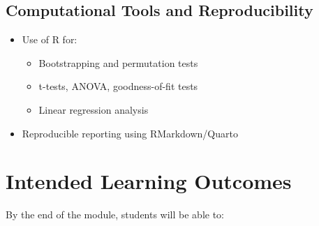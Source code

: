 \documentclass[
  a4paper,
  DIV=11,
  numbers=noendperiod,
  oneside]{scrreprt}
\providecommand{\tightlist}{%
  \setlength{\itemsep}{0pt}\setlength{\parskip}{0pt}}
\theoremstyle{plain}
\theoremstyle{definition}
\theoremstyle{definition}
\theoremstyle{definition}
\theoremstyle{plain}
\theoremstyle{remark}
\begin{document}
\subsection*{Computational Tools and
Reproducibility}\label{computational-tools-and-reproducibility}

\begin{itemize}
\tightlist
\item
  Use of R for:

  \begin{itemize}
  \tightlist
  \item
    Bootstrapping and permutation tests\\
  \item
    t-tests, ANOVA, goodness-of-fit tests\\
  \item
    Linear regression analysis\\
  \end{itemize}
\item
  Reproducible reporting using RMarkdown/Quarto
\end{itemize}

\section*{Intended Learning Outcomes}\label{intended-learning-outcomes}


By the end of the module, students will be able to:
\end{document}
